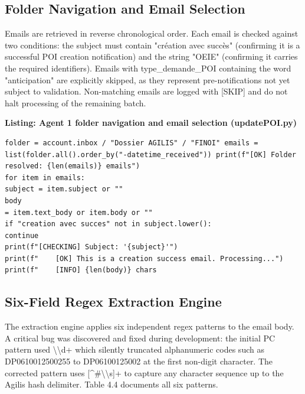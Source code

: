\subsection{Folder Navigation and Email Selection}

Emails are retrieved in reverse chronological order. Each email is checked against two conditions: the subject must contain "création avec succès" (confirming it is a successful POI creation notification) and the string "OEIE" (confirming it carries the required identifiers). Emails with type\_demande\_POI containing the word "anticipation" are explicitly skipped, as they represent pre-notifications not yet subject to validation. Non-matching emails are logged with [SKIP] and do not halt processing of the remaining batch.

\begin{center}\small\textbf{Listing: Agent 1 folder navigation and email selection (updatePOI.py)}\end{center}
\begin{Verbatim}[breaklines=true,fontsize=\footnotesize,frame=single]
folder = account.inbox / "Dossier AGILIS" / "FINOI" emails = list(folder.all().order_by("-datetime_received")) print(f"[OK] Folder resolved: {len(emails)} emails")
for item in emails:
subject = item.subject or ""
body
= item.text_body or item.body or ""
if "creation avec succes" not in subject.lower():
continue
print(f"[CHECKING] Subject: '{subject}'")
print(f"	[OK] This is a creation success email. Processing...")
print(f"	[INFO] {len(body)} chars
\end{Verbatim}

\subsection{Six-Field Regex Extraction Engine}

The extraction engine applies six independent regex patterns to the email body. A critical bug was discovered and fixed during development: the initial PC pattern used \textbackslash{}\textbackslash{}d+ which silently truncated alphanumeric codes such as DP0610012500255 to DP06100125002 at the first non-digit character. The corrected pattern uses [\textasciicircum{}\#\textbackslash{}\textbackslash{}s]+ to capture any character sequence up to the Agilis hash delimiter. Table 4.4 documents all six patterns.

